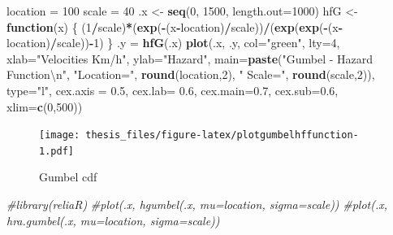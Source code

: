 \documentclass[12pt,oneside]{reedthesis}
\newenvironment{Shaded}{\begin{snugshade}}{\end{snugshade}}
\newcommand{\CharTok}[1]{\textcolor[rgb]{0.31,0.60,0.02}{#1}}
\newcommand{\CommentTok}[1]{\textcolor[rgb]{0.56,0.35,0.01}{\textit{#1}}}
\newcommand{\ControlFlowTok}[1]{\textcolor[rgb]{0.13,0.29,0.53}{\textbf{#1}}}
\newcommand{\DataTypeTok}[1]{\textcolor[rgb]{0.13,0.29,0.53}{#1}}
\newcommand{\DecValTok}[1]{\textcolor[rgb]{0.00,0.00,0.81}{#1}}
\newcommand{\FloatTok}[1]{\textcolor[rgb]{0.00,0.00,0.81}{#1}}
\newcommand{\KeywordTok}[1]{\textcolor[rgb]{0.13,0.29,0.53}{\textbf{#1}}}
\newcommand{\NormalTok}[1]{#1}
\newcommand{\OperatorTok}[1]{\textcolor[rgb]{0.81,0.36,0.00}{\textbf{#1}}}
\newcommand{\StringTok}[1]{\textcolor[rgb]{0.31,0.60,0.02}{#1}}
\begin{document}
\footnotesize
\begin{Shaded}
\begin{Highlighting}[]
\NormalTok{location =}\StringTok{ }\DecValTok{100}
\NormalTok{scale =}\StringTok{ }\DecValTok{40}
\NormalTok{.x <-}\StringTok{ }\KeywordTok{seq}\NormalTok{(}\DecValTok{0}\NormalTok{, }\DecValTok{1500}\NormalTok{, }\DataTypeTok{length.out=}\DecValTok{1000}\NormalTok{)}
\NormalTok{hfG <-}\StringTok{ }\ControlFlowTok{function}\NormalTok{(x) \{}
\NormalTok{  (}\DecValTok{1}\OperatorTok{/}\NormalTok{scale)}\OperatorTok{*}\NormalTok{(}\KeywordTok{exp}\NormalTok{(}\OperatorTok{-}\NormalTok{(x}\OperatorTok{-}\NormalTok{location)}\OperatorTok{/}\NormalTok{scale))}\OperatorTok{/}\NormalTok{(}\KeywordTok{exp}\NormalTok{(}\KeywordTok{exp}\NormalTok{(}\OperatorTok{-}\NormalTok{(x}\OperatorTok{-}\NormalTok{location)}\OperatorTok{/}\NormalTok{scale))}\OperatorTok{-}\DecValTok{1}\NormalTok{)}
\NormalTok{  \}}
\NormalTok{.y =}\StringTok{ }\KeywordTok{hfG}\NormalTok{(.x)}
\KeywordTok{plot}\NormalTok{(.x, .y, }\DataTypeTok{col=}\StringTok{"green"}\NormalTok{, }\DataTypeTok{lty=}\DecValTok{4}\NormalTok{, }
     \DataTypeTok{xlab=}\StringTok{"Velocities Km/h"}\NormalTok{, }\DataTypeTok{ylab=}\StringTok{"Hazard"}\NormalTok{, }
     \DataTypeTok{main=}\KeywordTok{paste}\NormalTok{(}\StringTok{"Gumbel - Hazard Function}\CharTok{\textbackslash{}n}\StringTok{"}\NormalTok{, }\StringTok{"Location="}\NormalTok{, }
     \KeywordTok{round}\NormalTok{(location,}\DecValTok{2}\NormalTok{), }\StringTok{" Scale="}\NormalTok{, }\KeywordTok{round}\NormalTok{(scale,}\DecValTok{2}\NormalTok{)), }\DataTypeTok{type=}\StringTok{"l"}\NormalTok{, }
     \DataTypeTok{cex.axis =} \FloatTok{0.5}\NormalTok{, }\DataTypeTok{cex.lab=} \FloatTok{0.6}\NormalTok{, }\DataTypeTok{cex.main=}\FloatTok{0.7}\NormalTok{, }\DataTypeTok{cex.sub=}\FloatTok{0.6}\NormalTok{, }
     \DataTypeTok{xlim=}\KeywordTok{c}\NormalTok{(}\DecValTok{0}\NormalTok{,}\DecValTok{500}\NormalTok{))}
\end{Highlighting}
\end{Shaded}
\begin{figure}
\centering
\texttt{[image: thesis\_files/figure-latex/plotgumbelhffunction-1.pdf]}
\caption{\label{fig:plotgumbelhffunction}Gumbel cdf}
\end{figure}
\begin{Shaded}
\begin{Highlighting}[]
\CommentTok{#library(reliaR)}
\CommentTok{#plot(.x, hgumbel(.x, mu=location, sigma=scale))}
\CommentTok{#plot(.x, hra.gumbel(.x, mu=location, sigma=scale))}
\end{Highlighting}
\end{Shaded}
\normalsize
\end{document}
